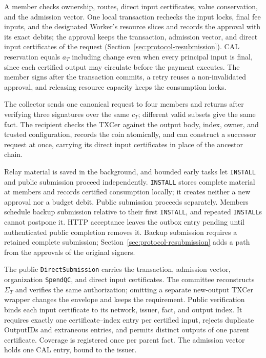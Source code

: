 A member checks ownership, routes, direct input certificates, value conservation, and the admission vector. One local transaction rechecks the input locks, final fee inputs, and the designated Worker's resource slices and records the approval with its exact debits; the approval keeps the transaction, admission vector, and direct input certificates of the request (Section~\ref{sec:protocol-resubmission}). CAL reservation equals $a_T$ including change even when every principal input is final, since each certified output may circulate before the payment executes. The member signs after the transaction commits, a retry reuses a non-invalidated approval, and releasing resource capacity keeps the consumption locks.

The collector sends one canonical request to four members and returns after verifying three signatures over the same $c_T$; different valid subsets give the same fact. The recipient checks the TXCer against the output body, index, owner, and trusted configuration, records the coin atomically, and can construct a successor request at once, carrying its direct input certificates in place of the ancestor chain.

Relay material is saved in the background, and bounded early tasks let \texttt{INSTALL} and public submission proceed independently. \texttt{INSTALL} stores complete material at members and records certified consumption locally; it creates neither a new approval nor a budget debit. Public submission proceeds separately. Members schedule backup submission relative to their first \texttt{INSTALL}, and repeated \texttt{INSTALL}s cannot postpone it. HTTP acceptance leaves the outbox entry pending until authenticated public completion removes it. Backup submission requires a retained complete submission; Section~\ref{sec:protocol-resubmission} adds a path from the approvals of the original signers.

The public \texttt{DirectSubmission} carries the transaction, admission vector, organization \texttt{SpendQC}, and direct input certificates. The committee reconstructs $\Sigma_T$ and verifies the same authorization; omitting a separate new-output TXCer wrapper changes the envelope and keeps the requirement. Public verification binds each input certificate to its network, issuer, fact, and output index. It requires exactly one certificate--index entry per certified input, rejects duplicate OutputIDs and extraneous entries, and permits distinct outputs of one parent certificate. Coverage is registered once per parent fact. The admission vector holds one CAL entry, bound to the issuer.

